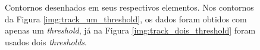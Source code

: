 \begin{figure}[H]
	\centering
	\hspace{3em}
	\caption{Contornos desenhados em seus respectivos elementos. Nos contornos da Figura \ref{img:track_um_threshold}, os dados foram obtidos com apenas um \textit{threshold}, já na Figura \ref{img:track_dois_threshold} foram usados dois \textit{thresholds}.}
	\label{img:threshold_logotipo}
\end{figure}

